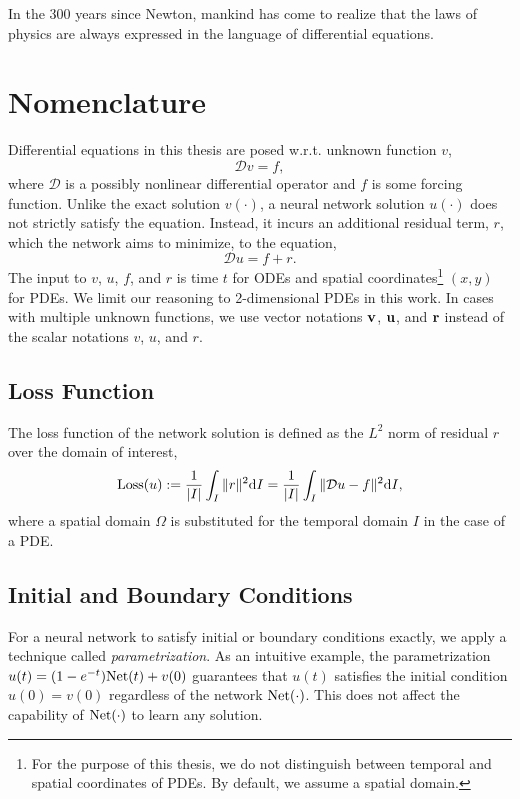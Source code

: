 \begin{savequote}[75mm]
    In the 300 years since Newton, mankind has come to realize that the laws of physics are always expressed in the language of differential equations.
\end{savequote}

\chapter{Nomenclature} \label{chapter:symbols-and-notations}
    Differential equations in this thesis are posed w.r.t. unknown function $v$,
    {
        \small
        \begin{equation}
            \mathcal{D} v = f,
        \end{equation}
    }
    where $\mathcal{D}$ is a possibly nonlinear differential operator and $f$ is some forcing function.
    Unlike the exact solution $v(\cdot)$, a neural network solution $u(\cdot)$ does not strictly satisfy the equation.
    Instead, it incurs an additional residual term, $r$, which the network aims to minimize, to the equation, 
    {
        \small
        \begin{equation}
            \mathcal{D} u = f + r.
        \end{equation}
    }
    The input to $v$, $u$, $f$, and $r$ is time $t$ for ODEs and spatial coordinates\footnote{For the purpose of this thesis, we do not distinguish between temporal and spatial coordinates of PDEs. By default, we assume a spatial domain.} $(x, y)$ for PDEs.
    We limit our reasoning to 2-dimensional PDEs in this work.
    In cases with multiple unknown functions, we use vector notations $\mathbf{v}$, $\mathbf{u}$, and $\mathbf{r}$ instead of the scalar notations $v$, $u$, and $r$.

\section{Loss Function}
    The loss function of the network solution is defined as the $L^2$ norm of residual $r$ over the domain of interest,
    {
        \small
        \begin{align}
            \mathrm{Loss}{}(u) := \frac{1}{|I|} \int_{I} \|r\|^2 \mathrm{d}I = \frac{1}{|I|} \int_{I} \|\mathcal{D} u - f\|^2 \mathrm{d}I,
        \end{align}
    }
    where a spatial domain $\Omega$ is substituted for the temporal domain $I$ in the case of a PDE.

\section{Initial and Boundary Conditions}\label{section:initial-and-boundary-conditions}
    For a neural network to satisfy initial or boundary conditions exactly, we apply a technique called \textit{parametrization}. 
    As an intuitive example, the parametrization $u(t) = (1 - e^{-t}) \mathrm{Net}(t) + v(0)$ guarantees that $u(t)$ satisfies the initial condition $u(0)=v(0)$ regardless of the network $\mathrm{Net}(\cdot)$.
    This does not affect the capability of $\mathrm{Net}(\cdot)$ to learn any solution.

